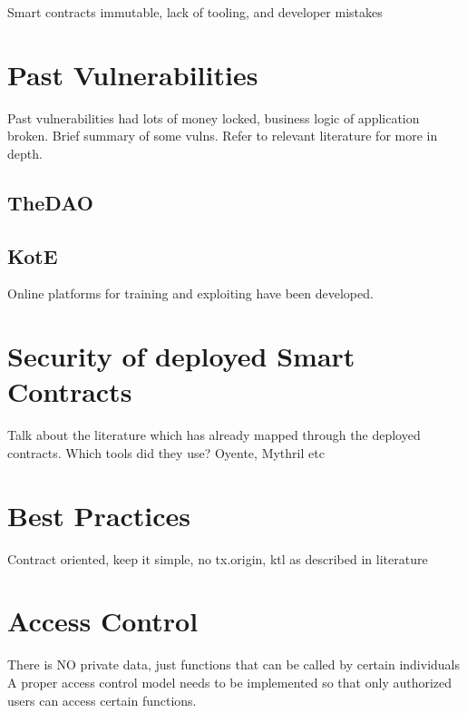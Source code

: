 Smart contracts immutable, lack of tooling, and developer mistakes

\section{Past Vulnerabilities}
Past vulnerabilities had lots of money locked, business logic of application broken. Brief summary of some vulns. Refer to relevant literature for more in depth.
\subsection{TheDAO}
\subsection{KotE}
Online platforms for training and exploiting have been developed.

\section{Security of deployed Smart Contracts}
Talk about the literature which has already mapped through the deployed contracts. 
Which tools did they use? Oyente, Mythril etc

\section{Best Practices}
Contract oriented, keep it simple, no tx.origin, ktl as described in literature

\section{Access Control}
There is NO private data, just functions that can be called by certain individuals
A proper access control model needs to be implemented so that only authorized users can access certain functions. 
